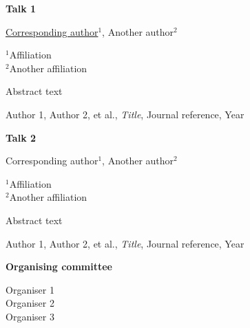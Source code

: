 \documentclass[a4paper,11pt]{article}
\newcommand{\TalkAbstract}[5]{%
  \textbf{#1}\par
  \vspace{0.3cm}%

  #2\par
  \vspace{0.3cm}%

  {\small #3}\par
  \vspace{0.3cm}%

  #4\par
  \vspace{0.3cm}%

  {\footnotesize #5}\par
  \vspace{0.5cm}%
}
\begin{document}
\TalkAbstract
  {Talk 1}
  {\underline{Corresponding author}$^{1}$, Another author$^{2}$}
  {$^{1}$Affiliation\\$^{2}$Another affiliation}
  {Abstract text}
  {Author 1, Author 2, et al., \emph{Title}, Journal reference, Year}

\TalkAbstract
  {Talk 2}
  {Corresponding author$^{1}$, Another author$^{2}$}
  {$^{1}$Affiliation\\$^{2}$Another affiliation}
  {Abstract text}
  {Author 1, Author 2, et al., \emph{Title}, Journal reference, Year}

\begin{center}
\large \textbf{Organising committee}
\vspace{0.3cm}

\normalsize
Organiser 1\\[3pt]
Organiser 2\\[3pt]
Organiser 3
\end{center}
\end{document}

